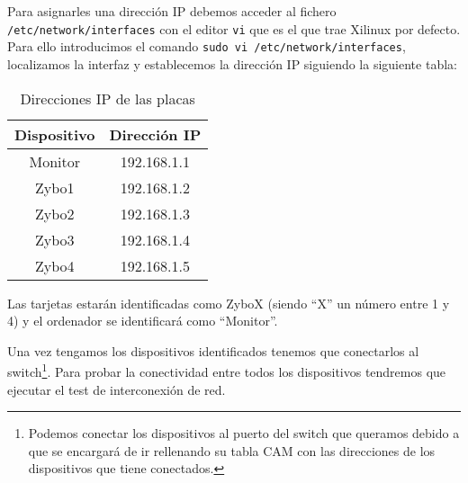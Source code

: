 \documentclass[12pt,letterpaper]{article}
\begin{document}
Para asignarles una dirección IP debemos acceder al fichero \texttt{/etc/network/interfaces} con el editor \texttt{vi} que es el que trae Xilinux por defecto. Para ello introducimos el comando \texttt{sudo vi /etc/network/interfaces}, localizamos la interfaz y establecemos la dirección IP siguiendo la siguiente tabla:

\begin{table}[h]
	\centering
	\begin{tabular}{|c|c|}
		\hline
		\textbf{Dispositivo} & \textbf{Dirección IP} \\ \hline
		Monitor & 192.168.1.1 \\ \hline
		Zybo1 & 192.168.1.2 \\ \hline
		Zybo2 & 192.168.1.3 \\ \hline
		Zybo3 & 192.168.1.4 \\ \hline
		Zybo4 & 192.168.1.5 \\ \hline
	\end{tabular}
\caption{Direcciones IP de las placas}
\label{Direcciones}
\end{table}

Las tarjetas estarán identificadas como ZyboX (siendo ``X'' un número entre 1 y 4) y el ordenador se identificará como ``Monitor''.

Una vez tengamos los dispositivos identificados tenemos que conectarlos al switch\footnote{Podemos conectar los dispositivos al puerto del switch que queramos debido a que se encargará de ir rellenando su tabla CAM con las direcciones de los dispositivos que tiene conectados.}. Para probar la conectividad entre todos los dispositivos tendremos que ejecutar el test de interconexión de red.
\end{document}
